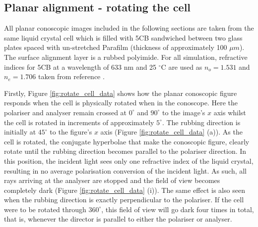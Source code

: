 \subsection{Planar alignment - rotating the cell}
All planar conoscopic images included in the following sections are taken from the same liquid crystal cell which is filled with 5CB sandwiched between two glass plates spaced with un-stretched Parafilm (thickness of approximately 100 $\mu m$). The surface alignment layer is a rubbed polyimide. For all simulation, refractive indices for 5CB at a wavelength of 633 nm and 25 $^{\circ}$C are used as $n_o=1.531$ and $n_e=1.706$ taken from reference \cite{Li2005}.

Firstly, Figure \ref{fig:rotate_cell_data} shows how the planar conoscopic figure responds when the cell is physically rotated when in the conoscope. Here the polariser and analyser remain crossed at $0^\circ$ and $90^\circ$ to the image's $x$ axis whilst the cell is rotated in increments of approximately $5^\circ$. The rubbing direction is initially at $45^\circ$ to the figure's $x$ axis (Figure \ref{fig:rotate_cell_data} (a)). As the cell is rotated, the conjugate hyperbolae that make the conoscopic figure, clearly rotate until the rubbing direction becomes parallel to the polariser direction. In this position, the incident light sees only one refractive index of the liquid crystal, resulting in no average polarisation conversion of the incident light. As such, all rays arriving at the analyser are stopped and the field of view becomes completely dark (Figure \ref{fig:rotate_cell_data} (i)). The same effect is also seen when the rubbing direction is exactly perpendicular to the polariser. If the cell were to be rotated through $360^\circ$, this field of view will go dark four times in total, that is, whenever the director is parallel to either the polariser or analyser.


